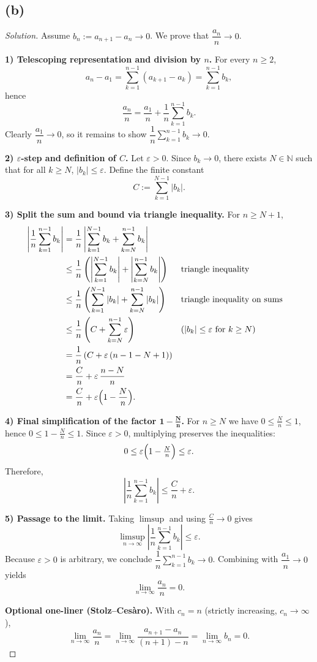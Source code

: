 \documentclass[12pt,a4paper]{article}
\theoremstyle{definition}
\theoremstyle{remark}
\newenvironment{solution}{\begin{proof}[Solution]}{\end{proof}}
\begin{document}
\subsection*{(b)}
\begin{solution}
Assume $b_n := a_{n+1}-a_n \to 0$. We prove that $\dfrac{a_n}{n} \to 0$.

\textbf{1) Telescoping representation and division by $n$.}
For every $n\ge 2$,
\[
a_n-a_1 = \sum_{k=1}^{n-1}(a_{k+1}-a_k) = \sum_{k=1}^{n-1} b_k,
\]
hence
\[
\frac{a_n}{n} = \frac{a_1}{n} + \frac{1}{n}\sum_{k=1}^{n-1} b_k.
\]
Clearly $\dfrac{a_1}{n}\to 0$, so it remains to show $\dfrac{1}{n}\sum_{k=1}^{n-1} b_k\to 0$.

\textbf{2) $\varepsilon$-step and definition of $C$.}
Let $\varepsilon>0$. Since $b_k\to 0$, there exists $N\in\mathbb{N}$ such that for all $k\ge N$, $|b_k|\le \varepsilon$. Define the finite constant
\[
C := \sum_{k=1}^{N-1} |b_k|.
\]

\textbf{3) Split the sum and bound via triangle inequality.}
For $n\ge N+1$,
\[
\begin{aligned}
\left|\frac{1}{n}\sum_{k=1}^{n-1} b_k\right|
&= \frac{1}{n}\left|\sum_{k=1}^{N-1} b_k + \sum_{k=N}^{n-1} b_k\right| \\
&\le \frac{1}{n}\left(\left|\sum_{k=1}^{N-1} b_k\right| + \left|\sum_{k=N}^{n-1} b_k\right|\right) && \text{triangle inequality} \\
&\le \frac{1}{n}\left(\sum_{k=1}^{N-1} |b_k| + \sum_{k=N}^{n-1} |b_k|\right) && \text{triangle inequality on sums} \\
&\le \frac{1}{n}\left(C + \sum_{k=N}^{n-1} \varepsilon\right) && (|b_k|\le \varepsilon\text{ for }k\ge N) \\
&= \frac{1}{n}\left(C + \varepsilon\,(n-1-N+1)\right) \\
&= \frac{C}{n} + \varepsilon\,\frac{n-N}{n} \\
&= \frac{C}{n} + \varepsilon\Bigl(1-\frac{N}{n}\Bigr).
\end{aligned}
\]

\textbf{4) Final simplification of the factor $\boldsymbol{1-\frac{N}{n}}$.}
For $n\ge N$ we have $0\le \tfrac{N}{n}\le 1$, hence $0\le 1-\tfrac{N}{n}\le 1$. Since $\varepsilon>0$, multiplying preserves the inequalities:
\[
0\le \varepsilon\Bigl(1-\tfrac{N}{n}\Bigr)\le \varepsilon.
\]
Therefore,
\[
\left|\frac{1}{n}\sum_{k=1}^{n-1} b_k\right| \le \frac{C}{n} + \varepsilon.
\]

\textbf{5) Passage to the limit.}
Taking $\limsup$ and using $\tfrac{C}{n}\to 0$ gives
\[
\limsup_{n\to\infty}\left|\frac{1}{n}\sum_{k=1}^{n-1} b_k\right| \le \varepsilon.
\]
Because $\varepsilon>0$ is arbitrary, we conclude $\dfrac{1}{n}\sum_{k=1}^{n-1} b_k\to 0$. Combining with $\dfrac{a_1}{n}\to 0$ yields
\[
\boxed{\displaystyle \lim_{n\to\infty}\frac{a_n}{n} = 0}.
\]

\textbf{Optional one-liner (Stolz--Ces\`aro).} With $c_n=n$ (strictly increasing, $c_n\to\infty$),
\[
\lim_{n\to\infty}\frac{a_n}{n} = \lim_{n\to\infty}\frac{a_{n+1}-a_n}{(n+1)-n} = \lim_{n\to\infty} b_n = 0.
\]
\end{solution}
\end{document}
